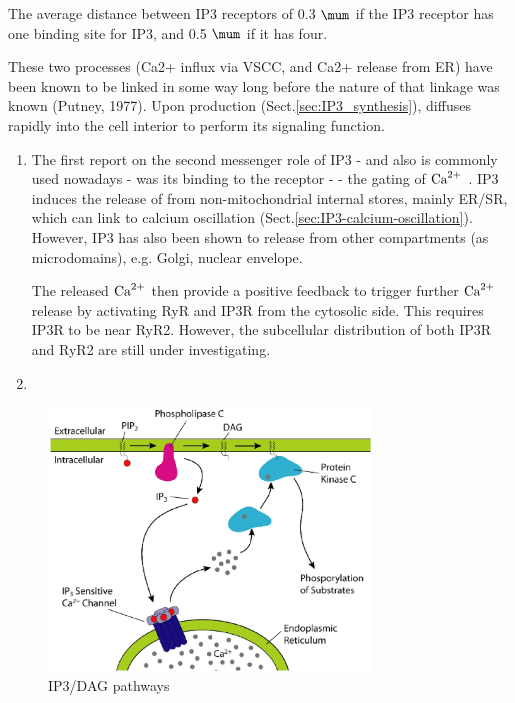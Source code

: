 \begin{framed}
The average distance between IP3 receptors of 0.3 $\mum$
if the IP3 receptor has one binding site for IP3, and 0.5 $\mum$
if it has four.

\end{framed}


These two processes (Ca2+ influx via VSCC, and Ca2+ release from ER) have been
known to be linked in some way long before the nature of that linkage was known
(Putney, 1977). Upon production (Sect.\ref{sec:IP3_synthesis}), \IPthree
diffuses rapidly into the cell interior to perform its signaling function.
\begin{enumerate}

  \item  The first report on the second messenger role of IP3 - and also is
  commonly used nowadays - was its binding to the receptor - \tIPthreeR - the
  gating of ${\text{Ca}^{2+}}$ \citep{berridge1993,  streb1983rcn}. IP3 induces the release
  of  from non-mitochondrial internal stores, mainly ER/SR, which can
  link to calcium oscillation (Sect.\ref{sec:IP3-calcium-oscillation}). However,
  IP3 has also been shown to release  from other compartments (as
  microdomains), e.g. Golgi, nuclear envelope\citep{rizzuto2006mic}. 

The released ${\text{Ca}^{2+}}$ then provide a positive feedback to trigger further ${\text{Ca}^{2+}}$
release by activating RyR and IP3R from the cytosolic side. This requires IP3R
to be near RyR2. However, the subcellular distribution of both IP3R and RyR2 are
still under investigating.


   \item 

\end{enumerate}


\begin{figure}[hbt]
 \centerline{\includegraphics[height=7cm]{./images/IP3_DAG_pathway.eps}}
\caption{IP3/DAG pathways}
\label{fig:IP3-DAG}
\end{figure}



